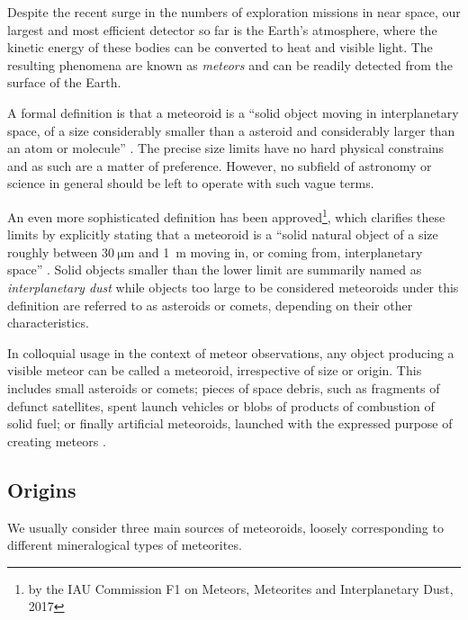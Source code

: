         Despite the recent surge in the numbers of exploration missions in near space,
        our largest and most efficient detector so far is the Earth's atmosphere,
        where the kinetic energy of these bodies can be converted to heat and visible light.
        The resulting phenomena are known as \emph{meteors} and can be readily detected from the surface of the Earth.

        A formal definition is that a meteoroid is a ``solid object moving in interplanetary space,
        of a size considerably smaller than a asteroid and considerably larger than an atom or molecule'' \citep{imo-glossary}.
        The precise size limits have no hard physical constrains and as such are a matter of preference.
        However, no subfield of astronomy or science in general should be left to operate with such vague terms.

        An even more sophisticated definition has been approved\footnote{by the IAU Commission F1 on Meteors, Meteorites and Interplanetary Dust, 2017},
        which clarifies these limits by explicitly stating that a meteoroid is a ``solid natural object
        of a size roughly between $\SI{30}{\micro\metre}$ and \SI{1}{\metre} moving in, or coming from, interplanetary space'' \citep{imo-definitions}.
        Solid objects smaller than the lower limit are summarily named as \emph{interplanetary dust} while objects
        too large to be considered meteoroids under this definition are referred to as
        asteroids or comets, depending on their other characteristics.

        In colloquial usage in the context of meteor observations, any object producing a visible meteor can be called a meteoroid,
        irrespective of size or origin. This includes small asteroids or comets; pieces of space debris,
        such as fragments of defunct satellites, spent launch vehicles or blobs of products of combustion of solid fuel;
        or finally artificial meteoroids, launched with the expressed purpose of creating meteors \citep{japončíci?} .

        \subsection{Origins} \label{iamo}
            We usually consider three main sources of meteoroids, loosely corresponding to different
            mineralogical types of meteorites.

